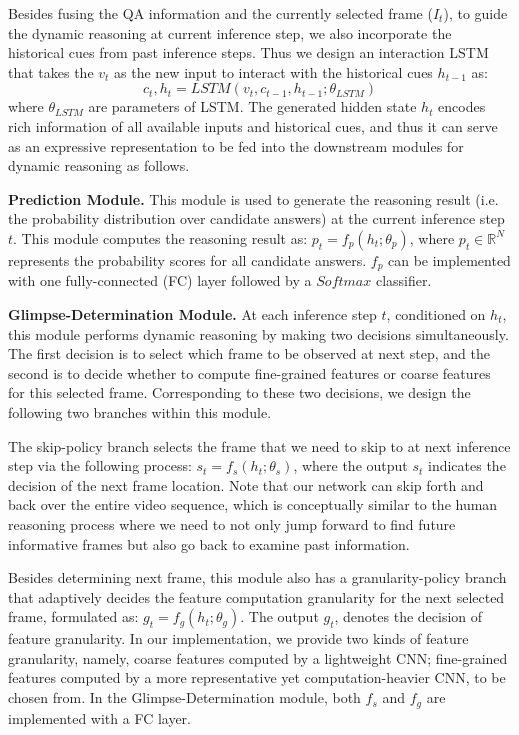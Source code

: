 \documentclass[final]{cvpr}
\begin{document}
Besides fusing the QA information and the currently selected frame ($I_t$), to guide the dynamic reasoning at current inference step, we also incorporate the historical cues from 
past inference steps. Thus we design an interaction LSTM that takes the $v_t$ as the new input to interact with the historical cues $h_{t-1}$ as:
\begin{equation}\label{eq.lstm}
    c_t, h_t = LSTM(v_t, c_{t-1}, h_{t-1};\theta_{LSTM})
\end{equation}
where $\theta_{LSTM}$ are parameters of LSTM. The generated hidden state $h_t$ encodes rich information of all available inputs and historical cues, and thus it can serve as an expressive representation to be fed into the downstream modules for dynamic reasoning as follows.

{\bf Prediction Module.} This module is used to generate the reasoning result (i.e. the probability distribution over candidate answers) at the current inference step $t$. This module computes the reasoning result as: $p_t=f_{p}(h_{t};\theta_{p})$, where $p_t\in\mathbb{R}^{N}$ represents the probability scores for all candidate answers. $f_{p}$ can be implemented with one fully-connected (FC) layer followed by a $Softmax$ classifier.


{\bf Glimpse-Determination Module.} At each inference step $t$, conditioned on $h_t$, this module performs dynamic reasoning by making two decisions simultaneously. The first decision is to select which frame to be observed at next step, and the second is to decide whether to compute fine-grained features or coarse features for this selected frame. 
Corresponding to these two decisions, we design the following two branches within this module.

The skip-policy branch selects the frame that we need to skip to at next inference step via the following process: $s_t=f_{s}(h_{t};\theta_{s})$, where the output $s_t$ indicates the decision of the next frame location. Note that our network can skip forth and back over the entire video sequence, which is conceptually similar to the human reasoning process where we need to not only jump forward to find future informative frames but also go back to examine past information. 


Besides determining next frame, this module also has a granularity-policy branch that adaptively decides the feature computation granularity for the next selected frame, formulated as:
$g_t=f_{g}(h_t;\theta_{g})$. The output $g_t$, 
denotes the decision of feature granularity. In our implementation, we provide two kinds of feature granularity, namely, coarse features computed by a lightweight CNN; fine-grained features computed by a more representative yet computation-heavier CNN, to be chosen from. In the Glimpse-Determination module, both $f_{s}$ and $f_{g}$ are implemented with a FC layer. 
\end{document}
